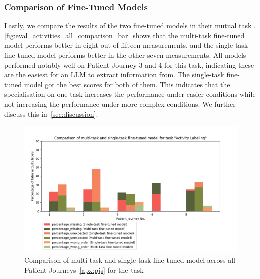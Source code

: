 \subsubsection{Comparison of Fine-Tuned Models}
Lastly, we compare the results of the two fine-tuned models in their mutual task . \autoref{fig:eval_activities_all_comparison_bar} shows that the multi-task fine-tuned model performs better in eight out of fifteen measurements, and the single-task fine-tuned model performs better in the other seven measurements. All models performed notably well on Patient Journey 3 and 4 for this task, indicating these are the easiest for an LLM to extract information from. The single-task fine-tuned model got the best scores for both of them. This indicates that the specialisation on one task increases the performance under easier conditions while not increasing the performance under more complex conditions. We further discuss this in~\autoref{sec:discussion}.

\begin{figure}[th]
    \centering
    \captionsetup{belowskip=0pt,aboveskip=0pt}
    \includegraphics[width=\textwidth]{bachelor_thesis/images/activites_all-single_vs_multi.png}
    \caption{Comparison of multi-task and single-task fine-tuned model across all Patient Journeys~\ref{apx:pjs} for the task } 
    \label{fig:eval_activities_all_comparison_bar}
\end{figure}
